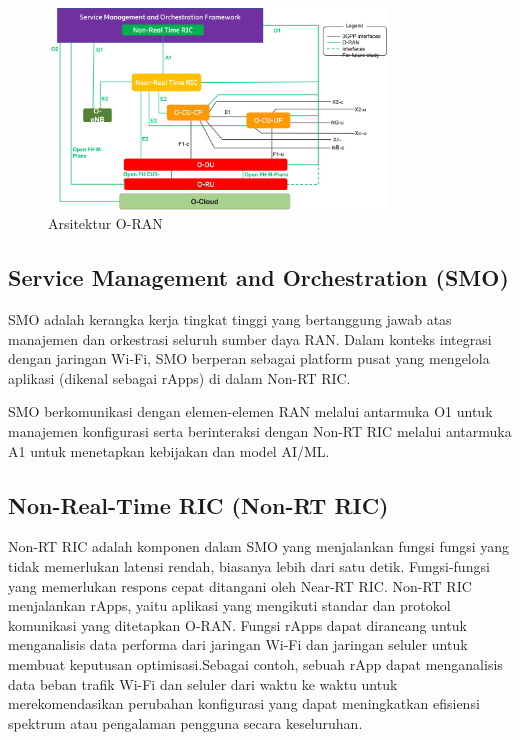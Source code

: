 \begin{figure}[htbp]
    \centering
    \includegraphics[width=0.8\textwidth]{assets/pics/o-ran-architecture.png}
    \caption{Arsitektur O-RAN}
    \label{fig:oran_architecture}
\end{figure}

\subsection{Service Management and Orchestration (SMO)}
SMO adalah kerangka kerja tingkat tinggi yang bertanggung jawab atas manajemen dan orkestrasi seluruh sumber daya RAN. Dalam konteks integrasi dengan jaringan Wi-Fi, SMO berperan sebagai platform pusat yang mengelola aplikasi (dikenal sebagai rApps) di dalam Non-RT RIC.

SMO berkomunikasi dengan elemen-elemen RAN melalui antarmuka O1 untuk manajemen konfigurasi serta berinteraksi dengan Non-RT RIC melalui antarmuka A1 untuk menetapkan kebijakan dan model AI/ML.

\subsection{Non-Real-Time RIC (Non-RT RIC)}

Non-RT RIC adalah komponen dalam SMO yang menjalankan fungsi fungsi yang tidak memerlukan latensi rendah, biasanya lebih dari satu detik. Fungsi-fungsi yang memerlukan respons cepat ditangani oleh Near-RT RIC. Non-RT RIC menjalankan rApps, yaitu aplikasi yang mengikuti standar dan protokol komunikasi yang ditetapkan O-RAN. Fungsi rApps dapat dirancang untuk menganalisis data performa dari jaringan Wi-Fi dan jaringan seluler untuk membuat keputusan optimisasi.Sebagai contoh, sebuah rApp dapat menganalisis data beban trafik Wi-Fi dan seluler dari waktu ke waktu untuk merekomendasikan perubahan konfigurasi yang dapat meningkatkan efisiensi spektrum atau pengalaman pengguna secara keseluruhan.

